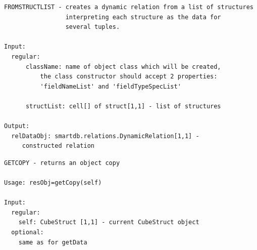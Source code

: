 \documentclass[letterpaper,10pt,english]{sphinxmanual}
\begin{document}
\label{chap_func:smartdb-relations-atypifiedstaticrelation-fromstructlist}
\begin{Verbatim}[commandchars=\\\{\}]
FROMSTRUCTLIST - creates a dynamic relation from a list of structures
                 interpreting each structure as the data for
                 several tuples.

Input:
  regular:
      className: name of object class which will be created,
          the class constructor should accept 2 properties:
          'fieldNameList' and 'fieldTypeSpecList'

      structList: cell[] of struct[1,1] - list of structures

Output:
  relDataObj: smartdb.relations.DynamicRelation[1,1] -
     constructed relation
\end{Verbatim}
\label{chap_func:smartdb-relations-atypifiedstaticrelation-getcopy}
\begin{Verbatim}[commandchars=\\\{\}]
GETCOPY - returns an object copy

Usage: resObj=getCopy(self)

Input:
  regular:
    self: CubeStruct [1,1] - current CubeStruct object
  optional:
    same as for getData
\end{Verbatim}
\end{document}
